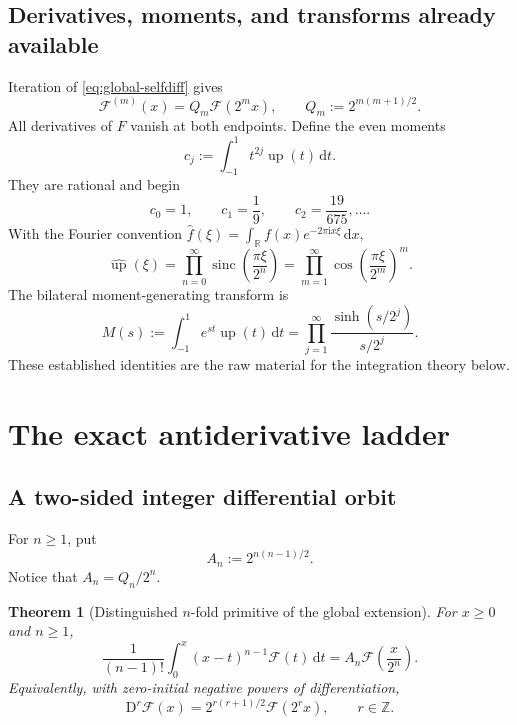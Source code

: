 \documentclass[11pt]{article}
\newtheorem{theorem}{Theorem}[section]
\theoremstyle{definition}
\theoremstyle{remark}
\DeclareMathOperator{\upf}{up}
\DeclareMathOperator{\sinc}{sinc}
\newcommand{\R}{\mathbb R}
\newcommand{\dd}{\,\mathrm d}
\newcommand{\ii}{\mathrm i}
\newcommand{\FF}{\mathscr F}
\begin{document}
\subsection{Derivatives, moments, and transforms already available}

Iteration of \eqref{eq:global-selfdiff} gives
\begin{equation}
 \FF^{(m)}(x)=Q_m\FF(2^m x),\qquad
 Q_m:=2^{m(m+1)/2}.                                      \label{eq:derivative-orbit}
\end{equation}
All derivatives of \(F\) vanish at both endpoints.  Define the even moments
\begin{equation}
 c_j:=\int_{-1}^1t^{2j}\upf(t)\dd t.                     \label{eq:cj}
\end{equation}
They are rational and begin
\[
 c_0=1,\qquad c_1=\frac19,\qquad c_2=\frac{19}{675},\ldots.
\]
With the Fourier convention
\(
 \widehat f(\xi)=\int_\R f(x)e^{-2\pi\ii x\xi}\dd x,
\)
\begin{equation}
 \widehat{\upf}(\xi)
 =\prod_{n=0}^{\infty}\sinc\!\left(\frac{\pi\xi}{2^n}\right)
 =\prod_{m=1}^{\infty}\cos\!\left(\frac{\pi\xi}{2^m}\right)^m. \label{eq:up-fourier}
\end{equation}
The bilateral moment-generating transform is
\begin{equation}
 M(s):=\int_{-1}^1e^{st}\upf(t)\dd t
 =\prod_{j=1}^{\infty}\frac{\sinh(s/2^j)}{s/2^j}.        \label{eq:M-product}
\end{equation}
These established identities are the raw material for the integration theory below.

\section{The exact antiderivative ladder}

\subsection{A two-sided integer differential orbit}

For \(n\ge1\), put
\begin{equation}
 A_n:=2^{n(n-1)/2}.                                      \label{eq:An}
\end{equation}
Notice that \(A_n=Q_n/2^n\).

\begin{theorem}[Distinguished \(n\)-fold primitive of the global extension]
\label{thm:global-primitive}
For \(x\ge0\) and \(n\ge1\),
\begin{equation}
 \frac1{(n-1)!}\int_0^x(x-t)^{n-1}\FF(t)\dd t
 =A_n\FF\!\left(\frac{x}{2^n}\right).                  \label{eq:global-primitive}
\end{equation}
Equivalently, with zero-initial negative powers of differentiation,
\begin{equation}
 \boxed{\quad
 \mathrm D^r\FF(x)=2^{r(r+1)/2}\FF(2^r x),
 \qquad r\in\mathbb Z.
 \quad}                                                  \label{eq:integer-orbit}
\end{equation}
\end{theorem}
\end{document}
